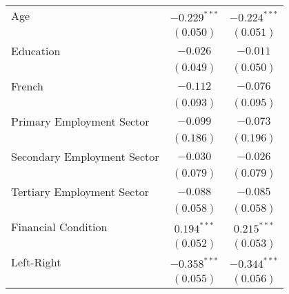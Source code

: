 \begin{center}
\begin{tiny}
\begin{longtable}{l@{} c@{} c@{}}
\quad Age                                                                            & $-0.229^{***}$   & $-0.224^{***}$   \\
                                                                                     & $(0.050)$        & $(0.051)$        \\
\quad Education                                                                      & $-0.026$         & $-0.011$         \\
                                                                                     & $(0.049)$        & $(0.050)$        \\
\quad French                                                                         & $-0.112$         & $-0.076$         \\
                                                                                     & $(0.093)$        & $(0.095)$        \\
\quad Primary Employment Sector                                                      & $-0.099$         & $-0.073$         \\
                                                                                     & $(0.186)$        & $(0.196)$        \\
\quad Secondary Employment Sector                                                    & $-0.030$         & $-0.026$         \\
                                                                                     & $(0.079)$        & $(0.079)$        \\
\quad Tertiary Employment Sector                                                     & $-0.088$         & $-0.085$         \\
                                                                                     & $(0.058)$        & $(0.058)$        \\
\quad Financial Condition                                                            & $0.194^{***}$    & $0.215^{***}$    \\
                                                                                     & $(0.052)$        & $(0.053)$        \\
\quad Left-Right                                                                     & $-0.358^{***}$   & $-0.344^{***}$   \\
                                                                                     & $(0.055)$        & $(0.056)$        \\

\end{longtable}
\end{tiny}
\end{center}
